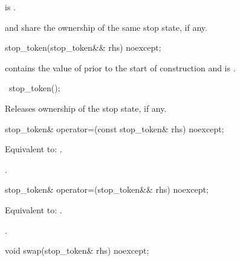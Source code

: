 \begin{itemdescr}
\pnum
\ensures {} is .
\begin{note}
 and  share the ownership of the same stop state,
if any.
\end{note}
\end{itemdescr}

%
\begin{itemdecl}
stop_token(stop_token&& rhs) noexcept;
\end{itemdecl}
\begin{itemdescr}
\pnum
\ensures
{} contains the value of 
prior to the start of construction
and  is .
\end{itemdescr}

%
\begin{itemdecl}
~stop_token();
\end{itemdecl}

\begin{itemdescr}
\pnum
\effects Releases ownership of the stop state, if any.
\end{itemdescr}

%
\begin{itemdecl}
stop_token& operator=(const stop_token& rhs) noexcept;
\end{itemdecl}

\begin{itemdescr}
\pnum
\effects Equivalent to: .

\pnum
\returns {}.
\end{itemdescr}

%
\begin{itemdecl}
stop_token& operator=(stop_token&& rhs) noexcept;
\end{itemdecl}

\begin{itemdescr}
\pnum
\effects Equivalent to: .

\pnum
\returns {}.
\end{itemdescr}

%
\begin{itemdecl}
void swap(stop_token& rhs) noexcept;
\end{itemdecl}

